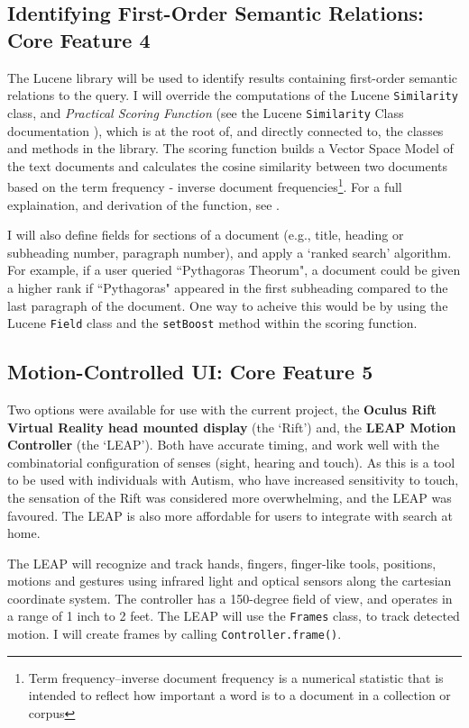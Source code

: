 \documentclass[a4paper, 11pt]{article}
\begin{document}
\begin{justify}
\subsection{Identifying First-Order Semantic Relations: Core Feature 4}\label{apache}
The Lucene library will be used to identify results containing first-order semantic relations to the query. I will override the computations of the Lucene \texttt{Similarity} class, and \textit{Practical Scoring Function} (see the Lucene \texttt{Similarity} Class documentation \cite{similarity}), which is at the root of, and directly connected to, the classes and methods in the library. The scoring function builds a Vector Space Model of the text documents and calculates the cosine similarity between two documents based on the term frequency - inverse document frequencies\footnote{Term frequency–inverse document frequency is a numerical statistic that is intended to reflect how important a word is to a document in a collection or corpus}. For a full explaination, and derivation of the function, see \cite{similarity}. 

I will also define fields for sections of a document (e.g., title, heading or subheading number, paragraph number), and apply a `ranked search' algorithm. For example, if a user queried ``Pythagoras Theorum", a document could be given a higher rank if ``Pythagoras" appeared in the first subheading compared to the last paragraph of the document. One way to acheive this would be by using the Lucene \texttt{Field} class and the \texttt{setBoost} method within the scoring function. 

\subsection{Motion-Controlled UI: Core Feature 5}\label{hardware}
Two options were available for use with the current project, the \textbf{Oculus Rift Virtual Reality head mounted display} (the `Rift') and, the \textbf{LEAP Motion Controller} (the `LEAP'). Both have accurate timing, and work well with the combinatorial configuration of senses (sight, hearing and touch). As this is a tool to be used with individuals with Autism, who have increased sensitivity to touch, the sensation of the Rift was considered more overwhelming, and the LEAP was favoured. The LEAP is also more affordable for users to integrate with search at home. 

The LEAP will recognize and track hands, fingers, finger-like tools, positions, motions and gestures using infrared light and optical sensors along the cartesian coordinate system. The controller has a 150-degree field of view, and operates in a range of 1 inch to 2 feet. The LEAP will use the \texttt{Frames} class, to track detected motion. I will create frames by calling \texttt{Controller.frame()}.


\end{justify}
\end{document}
